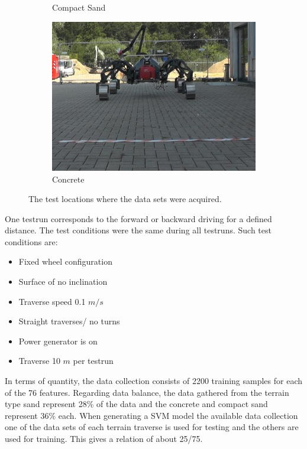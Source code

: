 \documentclass{article}
\begin{document}
\begin{figure}[!htb]
\begin{subfigure}[t]{0.33\textwidth}
        \caption{Compact Sand}
    \end{subfigure}
    \begin{subfigure}[t]{0.33\textwidth}
        \includegraphics[width=\textwidth]{../figures/concrete.png}
        \caption{Concrete}
    \end{subfigure}
 \caption{The test locations where the data sets were acquired.}
 \label{fig:TestLocs}
\end{figure}

One testrun corresponds to the forward or backward driving for a defined distance. The test conditions were the same during all testruns. Such test conditions are:
\begin{itemize}
\item Fixed wheel configuration
\item Surface of no inclination
\item Traverse speed 0.1 $m/s$
\item Straight traverses/ no turns
\item Power generator is on
\item Traverse 10 $m$ per testrun
\end{itemize}

In terms of quantity, the data collection consists of 2200 training samples for each of the 76 features. Regarding data balance, the data gathered from the terrain type sand represent 28\% of the data and the concrete and compact sand represent 36\% each. 
When generating a SVM model the available data collection one of the data sets of each terrain traverse is used for testing and the others are used for training. This gives a relation of about 25/75.
\end{document}
